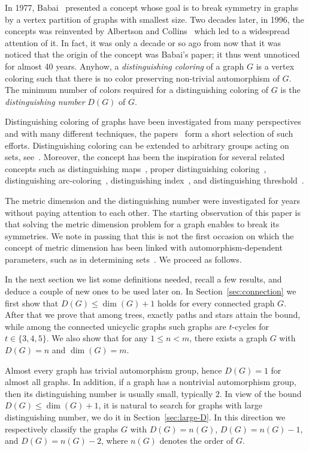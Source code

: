 \documentclass[12pt]{article}
\begin{document}
In 1977, Babai~\cite{babai} presented a concept whose goal is to break symmetry in graphs by a vertex partition of graphs with smallest size. Two decades later, in 1996, the concepts was reinvented by Albertson and Collins~\cite{alber} which led to a widespread attention of it. In fact, it was only a decade or so ago from now that it was noticed that the origin of the concept was Babai's paper; it thus went unnoticed for almost 40 years. Anyhow, a {\em distinguishing coloring} of a graph $G$ is a vertex coloring such that there is no color preserving non-trivial automorphism of $G$. The minimum number of colors required for a distinguishing coloring of $G$ is the {\it distinguishing number} $D(G)$ of $G$.

Distinguishing coloring of graphs have been investigated from many perspectives and with many different techniques, the papers~\cite{Ahmadi,  Collins2, Imrich, Russell} form a short selection of such efforts. Distinguishing coloring can be extended to arbitrary groups acting on sets, see~\cite{Babai, Bailey, Chan, Klavzar, Tymoczko}. Moreover, the concept has been the inspiration for several related concepts such as distinguishing maps~\cite{Tucker}, proper distinguishing coloring~\cite{Collins}, distinguishing arc-coloring~\cite{Kalinowski2}, distinguishing index~\cite{Kalinowski}, and distinguishing threshold~\cite{Shekarriz}. 

The metric dimension and the distinguishing number were investigated for years without paying attention to each other. The starting observation of this paper is that solving the metric dimension problem for a graph enables to break its symmetries. We note in passing that this is not the first occasion on which the concept of metric dimension has been linked with automorphism-dependent parameters, such as in determining sets~\cite{Det_2, Det_1}. We proceed as follows.

In the next section we list some definitions needed, recall a few results, and deduce a couple of new ones to be used later on. In Section~\ref{sec:connection} we first show that $D(G) \le \dim(G)+1$ holds for every connected graph $G$. After that we prove that among trees, exactly paths and stars attain the bound, while among the connected unicyclic graphs such graphs are $t$-cycles for $t\in \{3,4,5\}$. We also show that for any $1\leq n< m$, there exists a graph $G$ with $D(G)=n$ and $\dim(G)=m$.

Almost every graph has trivial automorphism group, hence $D(G) = 1$ for almost all graphs. In addition, if a graph has a nontrivial automorphism group, then its distinguishing number is usually small, typically $2$. In view of the bound $D(G) \le \dim(G)+1$, it is natural to search for graphs with large distinguishing number, we do it in Section~\ref{sec:large-D}. In this direction we respectively classify the graphs $G$ with $D(G) = n(G)$, $D(G) = n(G)-1$, and $D(G) = n(G)-2$, where $n(G)$ denotes the order of $G$. 
\end{document}
